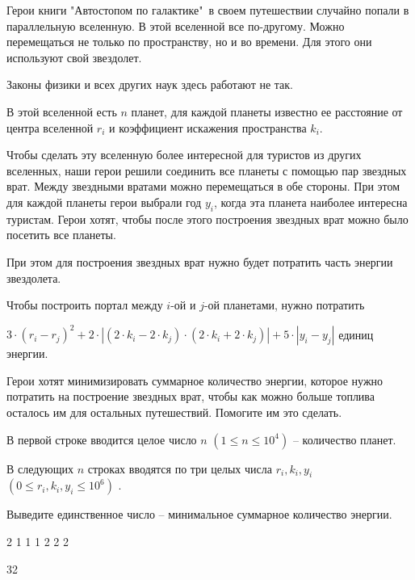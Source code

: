 
Герои книги "Автостопом по галактике"\ в своем путешествии случайно попали в параллельную вселенную. В этой вселенной все по-другому. Можно перемещаться не только по пространству, но и во времени. Для этого они используют свой звездолет.

Законы физики и всех других наук здесь работают не так.

В этой вселенной есть $n$ планет, для каждой планеты известно ее расстояние от центра вселенной $r_i$ и коэффициент искажения пространства $k_i$.

Чтобы сделать эту вселенную более интересной для туристов из других вселенных, наши герои решили соединить все планеты с помощью пар звездных врат. Между звездными вратами можно перемещаться в обе стороны. При этом для каждой планеты герои выбрали год $y_i$, когда эта планета наиболее интересна туристам. Герои хотят, чтобы после этого построения звездных врат можно было посетить все планеты.

При этом для построения звездных врат нужно будет потратить часть энергии звездолета.

Чтобы построить портал между $i$-ой и $j$-ой планетами, нужно потратить

$3 \cdot (r_{i} - r_{j})^{2} + 2 \cdot |(2 \cdot k_{i} - 2 \cdot k_{j}) \cdot (2 \cdot k_{i} + 2 \cdot k_{j})| + 5 \cdot |y_{i} - y_{j}|$ единиц энергии.

Герои хотят минимизировать суммарное количество энергии, которое нужно потратить на построение звездных врат, чтобы как можно больше топлива осталось им для остальных путешествий. Помогите им это сделать.


В первой строке вводится целое число $n$ $(1 \le n \le 10^4)$ -- количество планет.

В следующих $n$ строках вводятся по три целых числа $r_i, k_i, y_i$ $(0 \le r_i, k_i,y_i\le 10^6)$ .

\outputfmtSection

Выведите единственное число -- минимальное суммарное количество энергии.

\exampleSection


\begin{myverbbox}[\small]{\vinput}
2
1 1 1
2 2 2
\end{myverbbox}
\begin{myverbbox}[\small]{\voutput}
32
\end{myverbbox}

